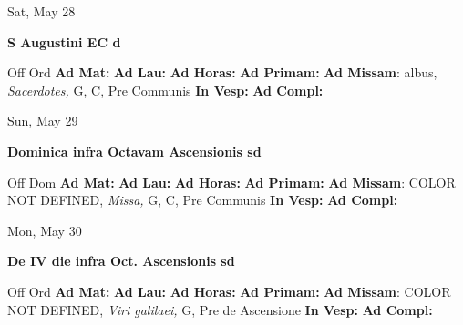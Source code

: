 \documentclass[10pt]{memoir}
\begin{document}
\begin{center}
\begin{minipage}{3.5in}
\vspace{2em}
\begin{center}Sat, May 28
\end{center}
\textbf{ \large S Augustini EC
\textnormal{\normalsize d}}

\begin{justify}Off Ord
\textbf{Ad Mat: }
\textbf{Ad Lau: }
\textbf{Ad Horas: }
\textbf{Ad Primam: }\textbf{Ad Missam}: albus, \textit{Sacerdotes,} G, C, Pre Communis
\textbf{In Vesp: }
\textbf{Ad Compl: }
\end{justify}
\end{minipage}
\end{center}

\begin{center}
\begin{minipage}{3.5in}
\vspace{2em}
\begin{center}Sun, May 29
\end{center}
\textbf{ \large Dominica infra Octavam Ascensionis
\textnormal{\normalsize sd}}

\begin{justify}Off Dom
\textbf{Ad Mat: }
\textbf{Ad Lau: }
\textbf{Ad Horas: }
\textbf{Ad Primam: }\textbf{Ad Missam}: COLOR NOT DEFINED, \textit{Missa,} G, C, Pre Communis
\textbf{In Vesp: }
\textbf{Ad Compl: }
\end{justify}
\end{minipage}
\end{center}

\begin{center}
\begin{minipage}{3.5in}
\vspace{2em}
\begin{center}Mon, May 30
\end{center}
\textbf{ \large De IV die infra Oct. Ascensionis
\textnormal{\normalsize sd}}

\begin{justify}Off Ord
\textbf{Ad Mat: }
\textbf{Ad Lau: }
\textbf{Ad Horas: }
\textbf{Ad Primam: }\textbf{Ad Missam}: COLOR NOT DEFINED, \textit{Viri galilaei,} G, Pre de Ascensione
\textbf{In Vesp: }
\textbf{Ad Compl: }
\end{justify}
\end{minipage}
\end{center}
\end{document}
